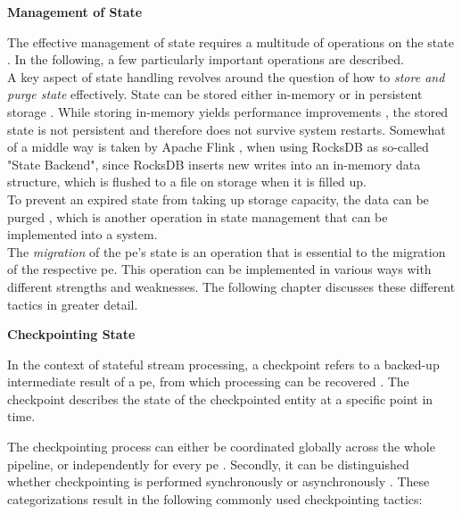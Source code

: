 \textbf{Management of State}\par
The effective management of state requires a multitude of operations on the state \cite{To.2017}. In the following, a few particularly important operations are described.\\
A key aspect of state handling revolves around the question of how to \textit{store and purge state} effectively. State can be stored either in-memory or in persistent storage \cite{To.2017}. While storing in-memory yields performance improvements \cite{Venkatesh.2019}, the stored state is not persistent and therefore does not survive system restarts. Somewhat of a middle way is taken by Apache Flink \cite{.06082020}, when using RocksDB as so-called "State Backend", since RocksDB \cite{GitHub.06082020} inserts new writes into an in-memory data structure, which is flushed to a file on storage when it is filled up.\\
To prevent an expired state from taking up storage capacity, the data can be purged \cite{To.2017}, which is another operation in state management that can be implemented into a system.\\
The \textit{migration} of the \gls{pe}'s state is an operation that is essential to the migration of the respective \gls{pe}. This operation can be implemented in various ways with different strengths and weaknesses. The following chapter discusses these different tactics in greater detail.\par

\textbf{Checkpointing State}\par
In the context of stateful stream processing, a checkpoint refers to a backed-up intermediate result of a \gls{pe}, from which processing can be recovered \cite{Zheng.20}. The checkpoint describes the state of the checkpointed entity at a specific point in time.\par
The checkpointing process can either be coordinated globally across the whole pipeline, or independently for every \gls{pe} \cite{Gibson.2014}. Secondly, it can be distinguished whether checkpointing is performed synchronously or asynchronously \cite{Gibson.2014}. These categorizations result in the following commonly used checkpointing tactics:

